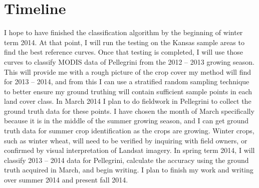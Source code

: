 \chapter{Timeline}

I hope to have finished the classification algorithm by the beginning of winter term 2014.  At that point, I will run the testing on the Kansas sample areas to find the best reference curves. Once that testing is completed, I will use those curves to classify MODIS data of Pellegrini from the 2012 -- 2013 growing season. This will provide me with a rough picture of the crop cover my method will find for 2013 -- 2014, and from this I can use a stratified random sampling technique to better ensure my ground truthing will contain sufficient sample points in each land cover class. In March 2014 I plan to do fieldwork in Pellegrini to collect the ground truth data for these points. I have chosen the month of March specifically because it is in the middle of the summer growing season, and I can get ground truth data for summer crop identification as the crops are growing. Winter crops, such as winter wheat, will need to be verified by inquiring with field owners, or confirmed by visual interpretation of Landsat imagery. In spring term 2014, I will classify 2013 -- 2014 data for Pellegrini, calculate the accuracy using the ground truth acquired in March, and begin writing. I plan to finish my work and writing over summer 2014 and present fall 2014.
